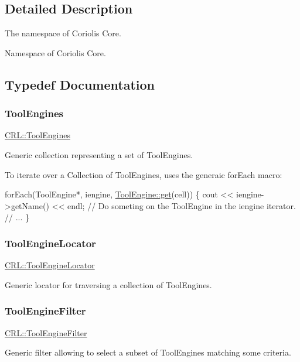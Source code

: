 \subsection{Detailed Description}
The namespace of Coriolis Core. 

Namespace of Coriolis Core. 

\subsection{Typedef Documentation}
\mbox{\label{namespaceCRL_ae49bc0c5f113bba964680768556dd1b3}} 
\subsubsection{\texorpdfstring{Tool\+Engines}{ToolEngines}}
{\footnotesize\ttfamily \hyperlink{namespaceCRL_ae49bc0c5f113bba964680768556dd1b3}{C\+R\+L\+::\+Tool\+Engines}}

Generic collection representing a set of Tool\+Engines.

To iterate over a Collection of Tool\+Engines, uses the generaic {\ttfamily for\+Each} macro\+: 
\begin{DoxyCode}
forEach(ToolEngine*, iengine, \hyperlink{classCRL_1_1ToolEngine_afb78e8f180ecc36ff8fa4e91e7885d37}{ToolEngine::get}(cell)) \{
  cout << iengine->getName() << endl;
  \textcolor{comment}{// Do someting on the ToolEngine in the iengine iterator.}
  \textcolor{comment}{// ...}
\}
\end{DoxyCode}
 \mbox{\label{namespaceCRL_a9c6426dc361a7b02fc55b7c19401c7aa}} 
\subsubsection{\texorpdfstring{Tool\+Engine\+Locator}{ToolEngineLocator}}
{\footnotesize\ttfamily \hyperlink{namespaceCRL_a9c6426dc361a7b02fc55b7c19401c7aa}{C\+R\+L\+::\+Tool\+Engine\+Locator}}

Generic locator for traversing a collection of Tool\+Engines. \mbox{\label{namespaceCRL_a976ed6ed06b1c3510c696de4c8960971}} 
\subsubsection{\texorpdfstring{Tool\+Engine\+Filter}{ToolEngineFilter}}
{\footnotesize\ttfamily \hyperlink{namespaceCRL_a976ed6ed06b1c3510c696de4c8960971}{C\+R\+L\+::\+Tool\+Engine\+Filter}}

Generic filter allowing to select a subset of Tool\+Engines matching some criteria. 